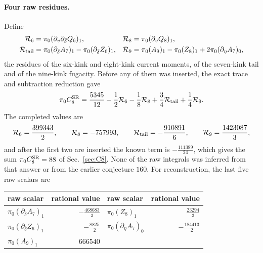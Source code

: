 \documentclass[11pt,a4paper]{article}
\numberwithin{equation}{section}
\newcommand{\CSR}{C^{\rm SR}}
\newcommand{\db}{\bar\delta}
\begin{document}
\paragraph{Four raw residues.} Define
\begin{equation}
\begin{aligned}
 \mathcal R_6&=\pi_0(\partial_v\partial_{\db}Q_6)_1, &
 \mathcal R_8&=\pi_0(\partial_vQ_8)_1,\\
 \mathcal R_{\rm tail}&=\pi_0(\partial_{\db}A_7)_1-\pi_0(\partial_{\db}Z_6)_1, &
 \mathcal R_9&=\pi_0(A_9)_1-\pi_0(Z_8)_1+2\pi_0(\partial_\eta A_7)_0,
\end{aligned}
\end{equation}
the residues of the six-kink and eight-kink current moments, of the seven-kink tail and of the nine-kink fugacity.
Before any of them was inserted, the exact trace and subtraction reduction gave
\begin{equation}
 \pi_0\CSR_8=\frac{5345}{12}-\frac12\mathcal R_6-\frac18\mathcal R_8+\frac34\mathcal R_{\rm tail}+\frac14\mathcal R_9 .
\end{equation}
The completed values are
\begin{equation}
 \mathcal R_6=\frac{399343}{2},\qquad \mathcal R_8=-757993,\qquad \mathcal R_{\rm tail}=-\frac{910891}{6},\qquad
 \mathcal R_9=\frac{1423087}{3},
\end{equation}
and after the first two are inserted the known term is $-\frac{111389}{24}$, which gives the sum
$\pi_0\CSR_8=88$ of Sec.~\ref{sec:C8}. None of the raw integrals was inferred from that answer or from the earlier
conjecture $160$. For reconstruction, the last five raw scalars are
\begin{center}\small
\begin{tabular}{@{}lr@{\qquad}lr@{}}
\toprule
raw scalar & rational value & raw scalar & rational value\\
\midrule
$\pi_0(\partial_{\db}A_7)_1$ & $-\frac{468683}{3}$ & $\pi_0(Z_8)_1$ & $\frac{23294}{3}$\\[2pt]
$\pi_0(\partial_{\db}Z_6)_1$ & $-\frac{8825}{2}$ & $\pi_0(\partial_\eta A_7)_0$ & $-\frac{184413}{2}$\\[2pt]
$\pi_0(A_9)_1$ & $666540$ & & \\
\bottomrule
\end{tabular}
\end{center}
\end{document}
